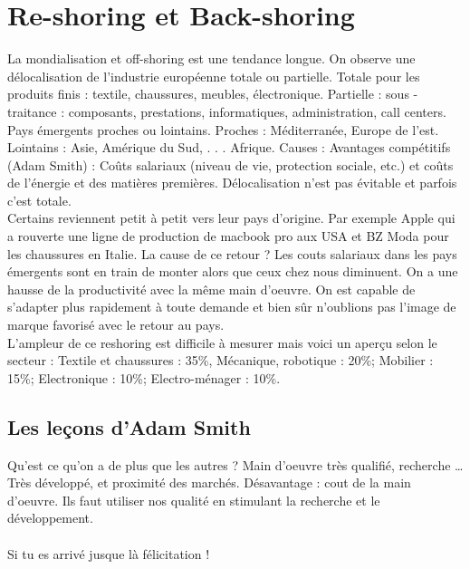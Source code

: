 \section{Re-shoring et Back-shoring}
La mondialisation et off-shoring est une tendance longue. On observe une
délocalisation de l’industrie européenne totale ou partielle. Totale pour les
produits finis : textile, chaussures, meubles, électronique. Partielle : sous
-traitance : composants, prestations, informatiques, administration, call
centers. Pays émergents proches ou lointains. Proches : Méditerranée,
Europe de l’est. Lointains : Asie, Amérique du Sud, . . . Afrique. Causes :
Avantages compétitifs (Adam Smith) : Coûts salariaux (niveau de vie, 
protection sociale, etc.) et coûts de l’énergie et des matières premières.
Délocalisation n'est pas évitable et parfois c'est totale. \\
Certains reviennent petit à petit vers leur pays d'origine. Par exemple Apple qui a rouverte une ligne de production de macbook pro aux USA et BZ Moda pour les chaussures en Italie. La cause de ce retour ? Les couts salariaux dans les pays émergents sont en train de monter alors que ceux chez nous diminuent. On a une hausse de la productivité avec la même main d’oeuvre. On est capable de s'adapter plus rapidement à toute demande et bien sûr n'oublions pas l'image de marque favorisé avec le retour au pays. \\
L'ampleur de ce reshoring est difficile à mesurer mais voici un aperçu selon
le secteur : Textile et chaussures : 35\%, Mécanique, robotique : 20\%;
Mobilier : 15\%; Electronique : 10\%; Electro-ménager : 10\%.

\subsection{Les leçons d'Adam Smith}
Qu’est ce qu’on a de plus que les autres ? Main d’oeuvre très qualifié, recherche … Très développé, et proximité des marchés. Désavantage : cout de la main d’oeuvre. Ils faut utiliser nos qualité en stimulant la recherche et le développement.\\
\\
Si tu es arrivé jusque là félicitation !